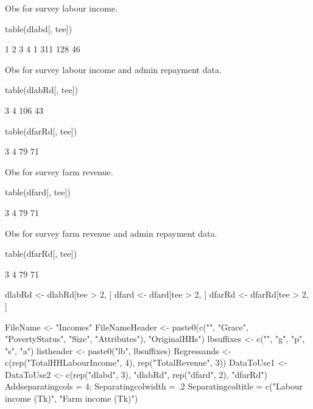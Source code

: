 Obs for survey labour income.
\begin{Schunk}
\begin{Sinput}
table(dlabd[, tee])
\end{Sinput}
\begin{Soutput}

  1   2   3   4 
  1 311 128  46 
\end{Soutput}
\end{Schunk}
Obs for survey labour income and admin repayment data.
\begin{Schunk}
\begin{Sinput}
table(dlabRd[, tee])
\end{Sinput}
\begin{Soutput}

  3   4 
106  43 
\end{Soutput}
\begin{Sinput}
table(dfarRd[, tee])
\end{Sinput}
\begin{Soutput}

 3  4 
79 71 
\end{Soutput}
\end{Schunk}
Obs for survey farm revenue.
\begin{Schunk}
\begin{Sinput}
table(dfard[, tee])
\end{Sinput}
\begin{Soutput}

 3  4 
79 71 
\end{Soutput}
\end{Schunk}
Obs for survey farm revenue and admin repayment data.
\begin{Schunk}
\begin{Sinput}
table(dfarRd[, tee])
\end{Sinput}
\begin{Soutput}

 3  4 
79 71 
\end{Soutput}
\begin{Sinput}
dlabRd <- dlabRd[tee > 2, ]
dfard <- dfard[tee > 2, ]
dfarRd <- dfarRd[tee > 2, ]
\end{Sinput}
\end{Schunk}
\begin{Schunk}
\begin{Sinput}
FileName <- "Incomes"
FileNameHeader <- paste0(c("", "Grace", "PovertyStatus", "Size", "Attributes"),
   "OriginalHHs")
lbsuffixes <- c("", "g", "p", "s", "a")
listheader <- paste0("lb", lbsuffixes)
Regressands <- c(rep("TotalHHLabourIncome", 4), rep("TotalRevenue", 3))
DataToUse1 <- DataToUse2 <- c(rep("dlabd", 3), "dlabRd", rep("dfard", 2), "dfarRd")
Addseparatingcols = 4; Separatingcolwidth = .2
Separatingcoltitle = c("Labour income (Tk)", "Farm income (Tk)")
\end{Sinput}
\end{Schunk}
